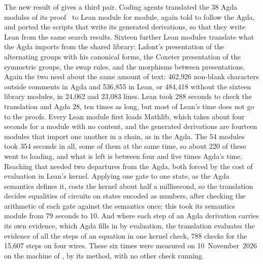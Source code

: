 \documentclass[acmsmall,screen,nonacm]{acmart}
\begin{document}
The new result of  gives a third pair. Coding agents translated the 38 Agda modules of its proof~\cite{equacert2026artifact} to Lean module for module, again told to follow the Agda, and ported the scripts that write its generated derivations, so that they write Lean from the same search results. Sixteen further Lean modules translate what the Agda imports from the shared library: Lafont's presentation of the alternating groups with his canonical forms, the Coxeter presentation of the symmetric groups, the swap rules, and the morphisms between presentations. Again the two need about the same amount of text: 462{,}926 non-blank characters outside comments in Agda and 536{,}855 in Lean, or 484{,}418 without the sixteen library modules, in 24{,}062 and 23{,}083 lines. Lean took 288 seconds to check the translation and Agda 28, ten times as long, but most of Lean's time does not go to the proofs. Every Lean module first loads Mathlib, which takes about four seconds for a module with no content, and the generated derivations are fourteen modules that import one another in a chain, as in the Agda. The 54 modules took 354 seconds in all, some of them at the same time, so about 220 of these went to loading, and what is left is between four and five times Agda's time. Reaching that needed two departures from the Agda, both forced by the cost of evaluation in Lean's kernel. Applying one gate to one state, as the Agda semantics defines it, costs the kernel about half a millisecond, so the translation decides equalities of circuits on states encoded as numbers, after checking the arithmetic of each gate against the semantics once; this took its semantics module from 79 seconds to 10. And where each step of an Agda derivation carries its own evidence, which Agda fills in by evaluation, the translation evaluates the evidence of all the steps of an equation in one kernel check, 788 checks for the 15{,}607 steps on four wires. These six times were measured on 10~November~2026 on the machine of , by its method, with no other check running.
\end{document}
